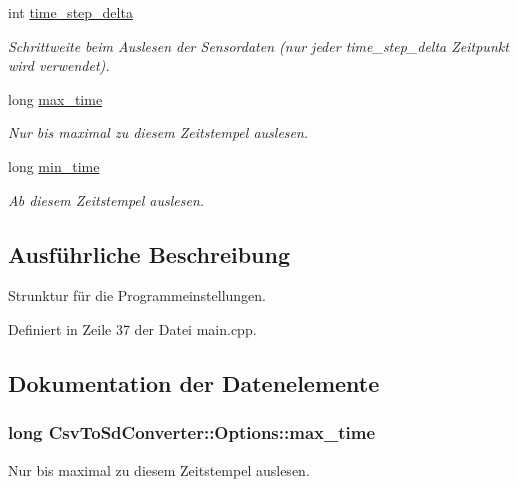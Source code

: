 \begin{DoxyCompactItemize}
int \hyperlink{structCsvToSdConverter_1_1Options_ae9cfb41a40de65e8762ffa89c94302bd}{time\-\_\-step\-\_\-delta}
\begin{DoxyCompactList}\small\item\em Schrittweite beim Auslesen der Sensordaten (nur jeder time\-\_\-step\-\_\-delta Zeitpunkt wird verwendet). \end{DoxyCompactList}\item 
long \hyperlink{structCsvToSdConverter_1_1Options_aed26fc81ee340679696b1b0a3db649ff}{max\-\_\-time}
\begin{DoxyCompactList}\small\item\em Nur bis maximal zu diesem Zeitstempel auslesen. \end{DoxyCompactList}\item 
long \hyperlink{structCsvToSdConverter_1_1Options_a076f7b517fccb4a20dd23905f27b8784}{min\-\_\-time}
\begin{DoxyCompactList}\small\item\em Ab diesem Zeitstempel auslesen. \end{DoxyCompactList}\end{DoxyCompactItemize}


\subsection{Ausführliche Beschreibung}
Strunktur für die Programmeinstellungen. 

Definiert in Zeile 37 der Datei main.\-cpp.



\subsection{Dokumentation der Datenelemente}
\hypertarget{structCsvToSdConverter_1_1Options_aed26fc81ee340679696b1b0a3db649ff}{
\subsubsection[{max\-\_\-time}]{\setlength{\rightskip}{0pt plus 5cm}long Csv\-To\-Sd\-Converter\-::\-Options\-::max\-\_\-time}}\label{structCsvToSdConverter_1_1Options_aed26fc81ee340679696b1b0a3db649ff}


Nur bis maximal zu diesem Zeitstempel auslesen. 



